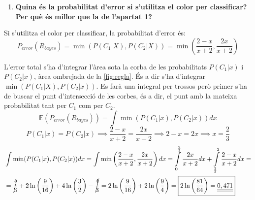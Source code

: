 \documentclass[a4paper]{article}
\begin{document}
\begin{enumerate}[resume]
	\item \textbf{Quina és la probabilitat d'error si s'utilitza el color per classificar? Per què és millor que la de l'apartat 1?}
\end{enumerate}

Si s'utilitza el color per classificar, la probabilitat d'error és:
$$
P_{error}(R_{bayes}) = \min(P(C_1|X),P(C_2|X)) = 
\boxed{\min\left(\frac{2 - x}{x + 2},\frac{2x}{x + 2}\right)}
$$

L'error total s'ha d'integrar l'àrea sota la corba de les probabilitats $P(C_1|x)$ i $P(C_2|x)$, àrea ombrejada de la \autoref{fig:regla}. És a dir s'ha d'integrar $\min(P(C_1|X),P(C_2|x))$. Es farà una integral per trossos però primer s'ha de buscar el punt d'intersecció de les corbes, és a dir, el punt amb la mateixa probabilitat tant per $C_1$ com per $C_2$.
$$
\mathbb{E}(P_{error}(R_{bayes})) = \int \min(P(C_1|x),P(C_2|x)) dx
$$
$$
P(C_1|x) = P(C_2|x) \implies \frac{2 - x}{x + 2} = \frac{2x}{x + 2} \implies
2 - x = 2x \implies \boxed{x = \frac{2}{3}}
$$
\begin{align*}
& \int \min(P(C_1|x),P(C_2|x)) dx = 
\int \min\left(\frac{2 - x}{x + 2},\frac{2x}{x + 2}\right) dx =
\int\limits_{0}^{\frac{2}{3}} \frac{2x}{x + 2} dx + 
\int\limits_{\frac{2}{3}}^{2} \frac{2 - x}{x + 2} dx = \\
& = \cancel{\frac{4}{3}} + 2\ln\left(\frac{9}{16}\right) + 
4\ln\left(\frac{3}{2} \right) - \cancel{\frac{4}{3}} = 
2\ln\left(\frac{9}{16}\right) + 2\ln\left( \frac{9}{4} \right) =
\boxed{2\ln\left(\frac{81}{64}\right) = \underline{\underline{0,471}}}
\end{align*}
\end{document}
